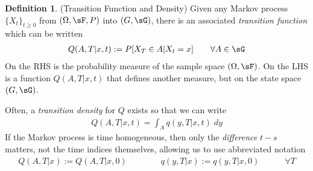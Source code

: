 \documentclass[12pt]{article}
\theoremstyle{plain}
\theoremstyle{definition}
\newtheorem{defn}[thm]{Definition}
\theoremstyle{remark}
\begin{document}
\begin{defn}(Transition Function and Density)
Given any Markov process $\{X_t\}_{t\geq 0}$ from $(\Omega,\sF,P)$ into
$(G,\sG)$, there is an associated \emph{transition function} which can
be written
\begin{align*}
  Q(A,T|x,t)
  := P[X_T\in A|X_t=x]
  \qquad
  \forall
  A\in\sG
\end{align*}
On the RHS is the probability measure of the sample space
$(\Omega,\sF)$. On the LHS is a function $Q(A,T|x,t)$ that defines
another measure, but on the state space $(G,\sG)$.

Often, a \emph{transition density} for $Q$ exists so that we can write
\begin{align*}
  Q(A,T|x,t)
  =
  \int_A q(y,T|x,t)\;dy
\end{align*}
If the Markov process is time homogeneous, then only the
\emph{difference} $t-s$ matters, not the time indices themselves,
allowing us to use abbreviated notation
\begin{align}
  Q(A,T|x)
  :=
  Q(A,T|x,0)
  \qquad
  \qquad
  q(y,T|x)
  :=
  q(y,T|x,0)
  \qquad
  \quad
  \forall T
  \label{transitionhomog}
\end{align}
\end{defn}
\end{document}
